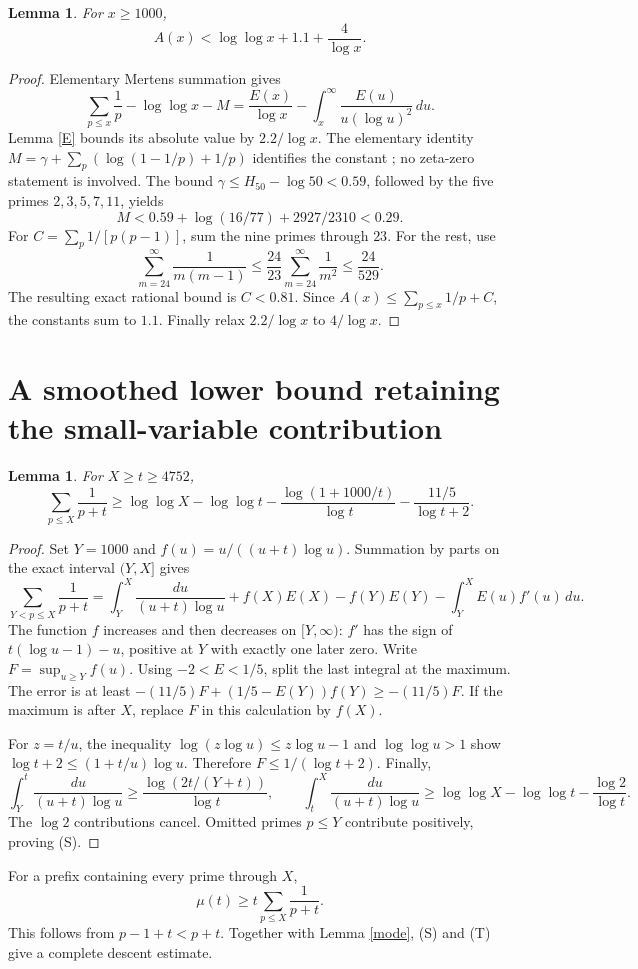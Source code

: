 \documentclass[11pt]{article}
\newtheorem{lemma}[theorem]{Lemma}
\begin{document}
\begin{lemma}\label{A}
For $x\ge1000$,
\[
                  A(x)<\log\log x+1.1+\frac4{\log x}.
\]
\end{lemma}
\begin{proof}
Elementary Mertens summation gives
\[
 \sum_{p\le x}\frac1p-\log\log x-M
 =\frac{E(x)}{\log x}-\int_x^\infty
                  \frac{E(u)}{u(\log u)^2}\,du .
\]
Lemma \ref{E} bounds its absolute value by $2.2/\log x$.
The elementary identity
$M=\gamma+\sum_p(\log(1-1/p)+1/p)$ identifies the constant
\cite{mertens}; no zeta-zero statement is involved.
The bound $\gamma\le H_{50}-\log50<0.59$, followed by the five primes
$2,3,5,7,11$, yields
\[
 M<0.59+\log(16/77)+2927/2310<0.29.
\]
For $C=\sum_p1/[p(p-1)]$, sum the nine primes through $23$.
For the rest, use
\[
 \sum_{m=24}^\infty\frac1{m(m-1)}
 \le\frac{24}{23}\sum_{m=24}^\infty\frac1{m^2}
 \le\frac{24}{529}.
\]
The resulting exact rational bound is $C<0.81$.
Since $A(x)\le\sum_{p\le x}1/p+C$, the constants sum to $1.1$.
Finally relax $2.2/\log x$ to $4/\log x$.
\end{proof}

\section{A smoothed lower bound retaining the small-variable contribution}
\begin{lemma}\label{smooth}
For $X\ge t\ge4752$,
\[
 \sum_{p\le X}\frac1{p+t}\ge
 \log\log X-\log\log t
 -\frac{\log(1+1000/t)}{\log t}
 -\frac{11/5}{\log t+2}. \tag{S}
\]
\end{lemma}
\begin{proof}
Set $Y=1000$ and $f(u)=u/((u+t)\log u)$.
Summation by parts on the exact interval $(Y,X]$ gives
\[
 \sum_{Y<p\le X}\frac1{p+t}
 =\int_Y^X\frac{du}{(u+t)\log u}
 +f(X)E(X)-f(Y)E(Y)-\int_Y^X E(u)f'(u)\,du .
\]
The function $f$ increases and then decreases on $[Y,\infty)$:
$f'$ has the sign of $t(\log u-1)-u$, positive at $Y$ with exactly
one later zero. Write $F=\sup_{u\ge Y}f(u)$.
Using $-2<E<1/5$, split the last integral at the maximum.
The error is at least
$-(11/5)F+(1/5-E(Y))f(Y)\ge-(11/5)F$.
If the maximum is after $X$, replace $F$ in this calculation by $f(X)$.

For $z=t/u$, the inequality $\log(z\log u)\le z\log u-1$ and
$\log\log u>1$ show
$\log t+2\le(1+t/u)\log u$.
Therefore $F\le1/(\log t+2)$.
Finally,
\[
 \int_Y^t\frac{du}{(u+t)\log u}
 \ge\frac{\log(2t/(Y+t))}{\log t},\qquad
 \int_t^X\frac{du}{(u+t)\log u}
 \ge\log\log X-\log\log t-\frac{\log2}{\log t}.
\]
The $\log2$ contributions cancel. Omitted primes $p\le Y$ contribute
positively, proving (S).
\end{proof}
For a prefix containing every prime through $X$,
\[
             \mu(t)\ge t\sum_{p\le X}\frac1{p+t}. \tag{T}
\]
This follows from $p-1+t<p+t$. Together with Lemma \ref{mode},
(S) and (T) give a complete descent estimate.
\end{document}
